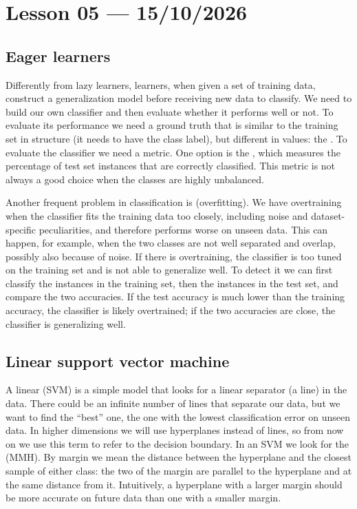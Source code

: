 \section{Lesson 05 --- 15/10/2026}

\subsection{Eager learners}
Differently from lazy learners,  learners, when given a set of training data, construct a generalization model before receiving new data to classify. We need to build our own classifier and then evaluate whether it performs well or not. To evaluate its performance we need a ground truth that is similar to the training set in structure (it needs to have the class label), but different in values: the . To evaluate the classifier we need a metric. One option is the , which measures the percentage of test set instances that are correctly classified. This metric is not always a good choice when the classes are highly unbalanced.

Another frequent problem in classification is  (overfitting). We have overtraining when the classifier fits the training data too closely, including noise and dataset-specific peculiarities, and therefore performs worse on unseen data. This can happen, for example, when the two classes are not well separated and overlap, possibly also because of noise. If there is overtraining, the classifier is too tuned on the training set and is not able to generalize well. To detect it we can first classify the instances in the training set, then the instances in the test set, and compare the two accuracies. If the test accuracy is much lower than the training accuracy, the classifier is likely overtrained; if the two accuracies are close, the classifier is generalizing well.

\subsection{Linear support vector machine}

A linear  (SVM) is a simple model that looks for a linear separator (a line) in the data. There could be an infinite number of lines that separate our data, but we want to find the ``best'' one, the one with the lowest classification error on unseen data. In higher dimensions we will use hyperplanes instead of lines, so from now on we use this term to refer to the decision boundary. In an SVM we look for the  (MMH). By margin we mean the distance between the hyperplane and the closest sample of either class: the two  of the margin are parallel to the hyperplane and at the same distance from it. Intuitively, a hyperplane with a larger margin should be more accurate on future data than one with a smaller margin.

